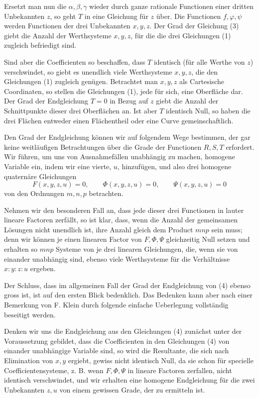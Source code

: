 \documentclass[11pt]{article}
\begin{document}
Ersetzt man nun die $\alpha,\beta,\gamma$ wieder durch ganze rationale Functionen einer dritten Unbekannten $z$, so geht $T$ in eine Gleichung für $z$ über. Die Functionen $f,\varphi,\psi$ werden Functionen der drei Unbekannten $x,y,z$. Der Grad der Gleichung (3) giebt die Anzahl der Werthsysteme $x,y,z$, für die die drei Gleichungen (1) zugleich befriedigt sind.

Sind aber die Coefficienten so beschaffen, dass $T$ identisch (für alle Werthe von $z$) verschwindet, so giebt es unendlich viele Werthsysteme $x,y,z$, die den Gleichungen (1) zugleich genügen. Betrachtet man $x,y,z$ als Cartesische Coordinaten, so stellen die Gleichungen (1), jede für sich, eine Oberfläche dar. Der Grad der Endgleichung $T=0$ in Bezug auf $z$ giebt die Anzahl der Schnittpunkte dieser drei Oberflächen an. Ist aber $T$ identisch Null, so haben die drei Flächen entweder einen Flächentheil oder eine Curve gemeinschaftlich.

Den Grad der Endgleichung können wir auf folgendem Wege bestimmen, der gar keine weitläufigen Betrachtungen über die Grade der Functionen $R,S,T$ erfordert. Wir führen, um uns von Ausnahmefällen unabhängig zu machen, homogene Variable ein, indem wir eine vierte, $u$, hinzufügen, und also drei homogene quaternäre Gleichungen
\begin{equation}
F(x,y,z,u)=0,
\qquad
\Phi(x,y,z,u)=0,
\qquad
\Psi(x,y,z,u)=0
\tag{4}
\end{equation}
von den Ordnungen $m,n,p$ betrachten.

Nehmen wir den besonderen Fall an, dass jede dieser drei Functionen in lauter lineare Factoren zerfällt, so ist klar, dass, wenn die Anzahl der gemeinsamen Lösungen nicht unendlich ist, ihre Anzahl gleich dem Product $mnp$ sein muss; denn wir können je einen linearen Factor von $F,\Phi,\Psi$ gleichzeitig Null setzen und erhalten so $mnp$ Systeme von je drei linearen Gleichungen, die, wenn sie von einander unabhängig sind, ebenso viele Werthsysteme für die Verhältnisse $x:y:z:u$ ergeben.

Der Schluss, dass im allgemeinen Fall der Grad der Endgleichung von (4) ebenso gross ist, ist auf den ersten Blick bedenklich. Das Bedenken kann aber nach einer Bemerkung von F. Klein durch folgende einfache Ueberlegung vollständig beseitigt werden.

Denken wir uns die Endgleichung aus den Gleichungen (4) zunächst unter der Voraussetzung gebildet, dass die Coefficienten in den Gleichungen (4) von einander unabhängige Variable sind, so wird die Resultante, die sich nach Elimination von $x,y$ ergiebt, gewiss nicht identisch Null, da sie schon für specielle Coefficientensysteme, z. B. wenn $F,\Phi,\Psi$ in lineare Factoren zerfallen, nicht identisch verschwindet, und wir erhalten eine homogene Endgleichung für die zwei Unbekannten $z,u$ von einem gewissen Grade, der zu ermitteln ist.
\end{document}
